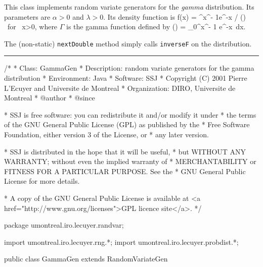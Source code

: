 
This class implements random variate generators for the {\em gamma\/} 
distribution. Its parameters are $\alpha>0$ and $\lambda>0$. 
Its density function is
\eq
  f(x) = \lambda^\alpha x^{\alpha - 1}e^{-\lambda x} / \Gamma(\alpha)
      \qquad\mbox{ for } x>0,          
\endeq
where $\Gamma$ is the gamma function defined by
\eq
   \Gamma (\alpha) = \int_0^\infty x^{\alpha - 1} e^{-x}\ dx.
\endeq

The (non-static) \texttt{nextDouble} method simply calls \texttt{inverseF} on the
distribution. 


\bigskip\hrule

\begin{code}
\begin{hide}
/*
 * Class:        GammaGen
 * Description:  random variate generators for the gamma distribution
 * Environment:  Java
 * Software:     SSJ 
 * Copyright (C) 2001  Pierre L'Ecuyer and Universite de Montreal
 * Organization: DIRO, Universite de Montreal
 * @author       
 * @since

 * SSJ is free software: you can redistribute it and/or modify it under
 * the terms of the GNU General Public License (GPL) as published by the
 * Free Software Foundation, either version 3 of the License, or
 * any later version.

 * SSJ is distributed in the hope that it will be useful,
 * but WITHOUT ANY WARRANTY; without even the implied warranty of
 * MERCHANTABILITY or FITNESS FOR A PARTICULAR PURPOSE.  See the
 * GNU General Public License for more details.

 * A copy of the GNU General Public License is available at
   <a href="http://www.gnu.org/licenses">GPL licence site</a>.
 */
\end{hide}
package umontreal.iro.lecuyer.randvar;\begin{hide}
import umontreal.iro.lecuyer.rng.*;
import umontreal.iro.lecuyer.probdist.*;
\end{hide}

public class GammaGen extends RandomVariateGen \begin{hide} {
   protected double alpha = -1.0;
   protected double lambda = -1.0;

\end{hide}
\end{code}

